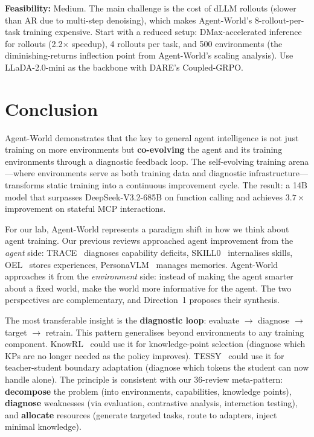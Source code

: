 \documentclass[11pt]{article}
\begin{document}
\textbf{Feasibility:} Medium. The main challenge is the cost of dLLM rollouts (slower than AR due to multi-step denoising), which makes Agent-World's 8-rollout-per-task training expensive. Start with a reduced setup: DMax-accelerated inference for rollouts (2.2$\times$ speedup), 4 rollouts per task, and 500 environments (the diminishing-returns inflection point from Agent-World's scaling analysis). Use LLaDA-2.0-mini as the backbone with DARE's Coupled-GRPO.

\section{Conclusion}

Agent-World demonstrates that the key to general agent intelligence is not just training on more environments but \textbf{co-evolving} the agent and its training environments through a diagnostic feedback loop. The self-evolving training arena---where environments serve as both training data and diagnostic infrastructure---transforms static training into a continuous improvement cycle. The result: a 14B model that surpasses DeepSeek-V3.2-685B on function calling and achieves $3.7\times$ improvement on stateful MCP interactions.

For our lab, Agent-World represents a paradigm shift in how we think about agent training. Our previous reviews approached agent improvement from the \textit{agent} side: TRACE~\cite{trace} diagnoses capability deficits, SKILL0~\cite{skill0} internalises skills, OEL~\cite{oel} stores experiences, PersonaVLM~\cite{personavlm} manages memories. Agent-World approaches it from the \textit{environment} side: instead of making the agent smarter about a fixed world, make the world more informative for the agent. The two perspectives are complementary, and Direction~1 proposes their synthesis.

The most transferable insight is the \textbf{diagnostic loop}: evaluate $\to$ diagnose $\to$ target $\to$ retrain. This pattern generalises beyond environments to any training component. KnowRL~\cite{knowrl} could use it for knowledge-point selection (diagnose which KPs are no longer needed as the policy improves). TESSY~\cite{tessy} could use it for teacher-student boundary adaptation (diagnose which tokens the student can now handle alone). The principle is consistent with our 36-review meta-pattern: \textbf{decompose} the problem (into environments, capabilities, knowledge points), \textbf{diagnose} weaknesses (via evaluation, contrastive analysis, interaction testing), and \textbf{allocate} resources (generate targeted tasks, route to adapters, inject minimal knowledge).
\end{document}
